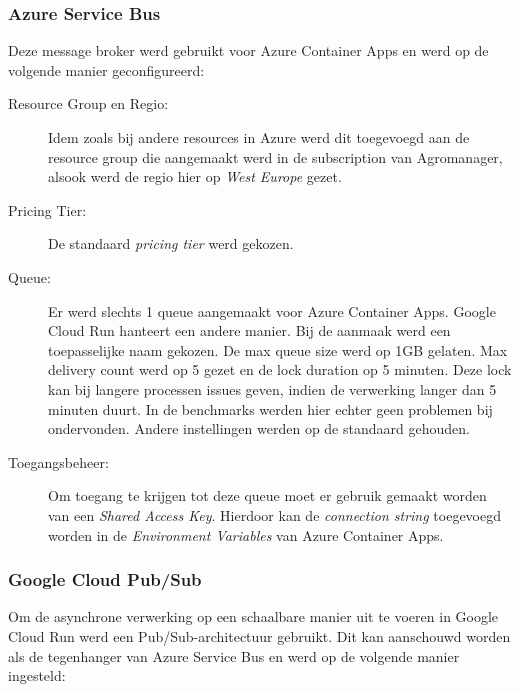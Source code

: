 \subsubsection*{Azure Service Bus}

Deze message broker werd gebruikt voor Azure Container Apps en werd op de volgende manier geconfigureerd:

\begin{description}
    \item[Resource Group en Regio:]
    Idem zoals bij andere resources in Azure werd dit toegevoegd aan de resource group die aangemaakt werd in de subscription van Agromanager, alsook werd de regio hier op \textit{West Europe} gezet.
    \item[Pricing Tier:]
    De standaard \textit{pricing tier} werd gekozen. 
    \item[Queue:] 
    Er werd slechts 1 queue aangemaakt voor Azure Container Apps. Google Cloud Run hanteert een andere manier. Bij de aanmaak werd een toepasselijke naam gekozen. De max queue size werd op 1GB gelaten. Max delivery count werd op 5 gezet en de lock duration op 5 minuten. Deze lock kan bij langere processen issues geven, indien de verwerking langer dan 5 minuten duurt. In de benchmarks werden hier echter geen problemen bij ondervonden. Andere instellingen werden op de standaard gehouden.
    \item[Toegangsbeheer:] 
    Om toegang te krijgen tot deze queue moet er gebruik gemaakt worden van een \textit{Shared Access Key}. Hierdoor kan de \textit{connection string} toegevoegd worden in de \textit{Environment Variables} van Azure Container Apps.
\end{description}

\subsubsection*{Google Cloud Pub/Sub}

Om de asynchrone verwerking op een schaalbare manier uit te voeren in Google Cloud Run werd een Pub/Sub-architectuur gebruikt. Dit kan aanschouwd worden als de tegenhanger van Azure Service Bus en werd op de volgende manier ingesteld:

